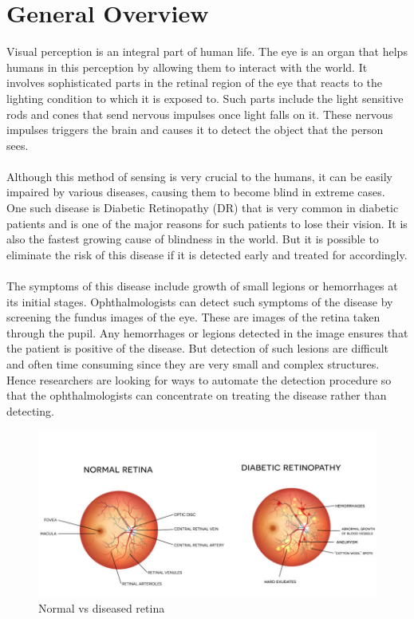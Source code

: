 \documentclass[12pt]{report}
\begin{document}
\section{General Overview}
Visual perception is an integral part of human life. The eye is an organ that helps
humans in this perception by allowing them to interact with the world. It involves
sophisticated parts in the retinal region of the eye that reacts to the lighting condition
to which it is exposed to. Such parts include the light sensitive rods and cones that
send nervous impulses once light falls on it. These nervous impulses triggers the
brain and causes it to detect the object that the person sees.\\
\\Although this method of sensing is very crucial to the humans, it can be easily
impaired by various diseases, causing them to become blind in extreme cases. One
such disease is Diabetic Retinopathy (DR) that is very common in diabetic patients
and is one of the major reasons for such patients to lose their vision. It is also the
fastest growing cause of blindness in the world. But it is possible to eliminate the
risk of this disease if it is detected early and treated for accordingly.\\
\\The symptoms of this disease include growth of small legions or hemorrhages at
its initial stages. Ophthalmologists can detect such symptoms of the disease by
screening the fundus images of the eye. These are images of the retina taken through
the pupil. Any hemorrhages or legions detected in the image ensures that the patient
is positive of the disease. But detection of such lesions are difficult and often time
consuming since they are very small and complex structures. Hence researchers are
looking for ways to automate the detection procedure so that the ophthalmologists
can concentrate on treating the disease rather than detecting.
\newpage
\begin{figure}[h]
	\centering
	\includegraphics[width=1\textwidth]{fig1}
	\caption{Normal vs diseased retina}
	\label{fig1}
\end{figure}
\end{document}
